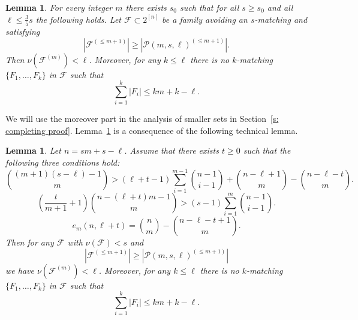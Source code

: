 \documentclass{article}
\newtheorem{lemma}[theorem]{Lemma}
\begin{document}


\begin{lemma} \label{l: matchings on layer m}
    For every integer $m$ there exists $s_0$ such that for all $s \geq s_0$ and all $\ell \leq \frac{3}{5}s$ the following holds. Let $\mathcal{F} \subset 2^{[n]}$ be a family avoiding an $s$-matching and satisfying
    \[
    |\mathcal{F}^{(\leq m + 1)}| \geq |\mathcal{P}(m, s, \ell)^{(\leq m + 1)}|.
    \]
    Then $\nu(\mathcal{F}^{(m)}) < \ell$. Moreover, for any $k \leq \ell$ there is no $k$-matching $\{F_1, \ldots, F_k\}$ in  $\mathcal{F}$ such that
    \[
    \sum_{i=1}^k |F_i| \leq km + k - \ell.
    \]
\end{lemma}

We will use the moreover part in the analysis of smaller sets in Section~\ref{s: completing proof}.
Lemma~\ref{l: matchings on layer m} is a consequence of the following technical lemma.

\begin{lemma} \label{l: parametrised matchings}
    Let $n = sm+s-\ell$. Assume that there exists $t \geq 0$ such that the following three conditions hold:
    {\small
    \begin{equation}
       \label{eq: condition t 1}
        {(m+1)(s-\ell)-1 \choose m} > (\ell+t-1)\sum_{i=1}^{m-1}{n-1 \choose i-1} + {n - \ell + 1 \choose m} - {n - \ell - t \choose m}.
    \end{equation}
    }
    \begin{equation}\label{eq: condition t 2}
        \left(\frac{t}{m+1} + 1\right){n - (\ell+t)m-1 \choose m} > (s-1)\sum_{i=1}^{m}{n-1 \choose i-1}.
    \end{equation}
    \begin{equation}\label{eq: condition t 3}
        e_{m}(n, \ell + t) = {n \choose m} - {n - \ell - t + 1 \choose m}.
    \end{equation}
    Then for any $\mathcal{F}$ with $\nu(\mathcal{F}) < s$ and
    \[
    |\mathcal{F}^{(\leq m+1)}| \geq |\mathcal{P}(m, s, \ell)^{(\leq m+1)}|
    \]
    we have $\nu(\mathcal{F}^{(m)}) < \ell$. Moreover, for any $k \leq \ell$ there is no $k$-matching $\{F_1, \ldots, F_k\}$ in $\mathcal{F}$ such that
    \[
    \sum_{i=1}^k |F_i| \leq km + k - \ell.
    \]
\end{lemma}
\end{document}
